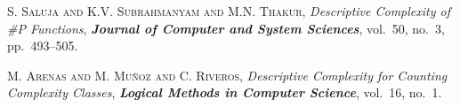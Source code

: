 \documentclass[bsl,meeting]{asl}
\begin{document}
\begin{thebibliography}{10}
{\scshape S. Saluja and K.V. Subrahmanyam and M.N. Thakur},
{\itshape Descriptive Complexity of \#{P} Functions},
{\bfseries\itshape Journal of Computer and System Sciences},
vol.~50, no.~3, pp.~493--505.

{\scshape M. Arenas and M. Mu{\~{n}}oz and C. Riveros},
{\itshape Descriptive Complexity for Counting Complexity Classes},
{\bfseries\itshape Logical Methods in Computer Science},
vol.~16, no.~1.
\end{thebibliography}

\vspace*{-0.5\baselineskip}
\end{document}
